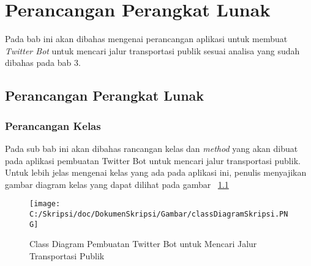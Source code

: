 \chapter{Perancangan Perangkat Lunak}
\label{chap:perancangan perangkat lunak}

Pada bab ini akan dibahas mengenai perancangan aplikasi untuk membuat \textit{Twitter Bot} untuk mencari jalur transportasi publik sesuai analisa yang sudah dibahas pada bab 3.

\section{Perancangan Perangkat Lunak}

\subsection{Perancangan Kelas}
Pada sub bab ini akan dibahas rancangan kelas dan \textit{method} yang akan dibuat pada aplikasi pembuatan Twitter Bot untuk mencari jalur transportasi publik. Untuk lebih jelas mengenai kelas yang ada pada aplikasi ini, penulis menyajikan gambar diagram kelas yang dapat dilihat pada gambar ~\ref{fig:classDiagramSkripsi}

\begin{figure}[htbp]
	\centering
		\texttt{[image: C:/Skripsi/doc/DokumenSkripsi/Gambar/classDiagramSkripsi.PNG]}
	\caption{Class Diagram Pembuatan Twitter Bot untuk Mencari Jalur Transportasi Publik}
	\label{fig:classDiagramSkripsi}
\end{figure}


